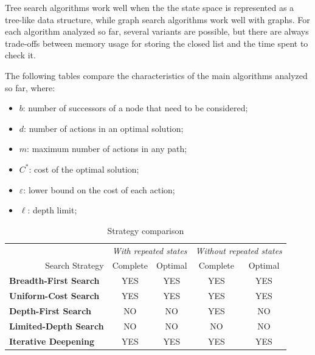 \documentclass{article}
\begin{document}
Tree search algorithms work well when the the state space is represented as a tree-like data structure, while graph search algorithms work well with graphs. For each algorithm analyzed so far, several variants are possible, but there are always trade-offs between memory usage for storing the closed list and the time spent to check it.


The following tables compare the characteristics of the main algorithms analyzed so far, where:
\begin{itemize}
    \item $b$: number of successors of a node that need to be considered;
    \item $d$: number of actions in an optimal solution;
    \item $m$: maximum number of actions in any path;
    \item $C^*$: cost of the optimal solution;
    \item $\varepsilon$: lower bound on the cost of each action;
    \item $\ell$: depth limit;
\end{itemize}
\begin{table}[h]
    \begin{tabular}{lcccc}
        \multicolumn{1}{l}{} & \multicolumn{2}{c}{\textit{With repeated states}} & \multicolumn{2}{c}{\textit{Without repeated states}} \\
        \multicolumn{1}{r||}{Search Strategy} & \multicolumn{1}{c|}{Complete} & \multicolumn{1}{c|}{Optimal} & \multicolumn{1}{c|}{Complete} & Optimal \\ \hline \hline
        \multicolumn{1}{l||}{\textbf{Breadth-First Search}} & \multicolumn{1}{c|}{YES} & \multicolumn{1}{c|}{YES} & \multicolumn{1}{c|}{YES} & YES \\ \hline
        \multicolumn{1}{l||}{\textbf{Uniform-Cost Search}} & \multicolumn{1}{c|}{YES} & \multicolumn{1}{c|}{YES} & \multicolumn{1}{c|}{YES} & YES \\ \hline
        \multicolumn{1}{l||}{\textbf{Depth-First Search}} & \multicolumn{1}{c|}{NO} & \multicolumn{1}{c|}{NO} & \multicolumn{1}{c|}{YES} & NO \\ \hline
        \multicolumn{1}{l||}{\textbf{Limited-Depth Search}} & \multicolumn{1}{c|}{NO} & \multicolumn{1}{c|}{NO} & \multicolumn{1}{c|}{NO} & NO \\ \hline
        \multicolumn{1}{l||}{\textbf{Iterative Deepening}} & \multicolumn{1}{c|}{YES} & \multicolumn{1}{c|}{YES} & \multicolumn{1}{c|}{YES} & YES
    \end{tabular}
    \caption{Strategy comparison}
    \label{tab:strategy_comparison}
\end{table}
\end{document}
